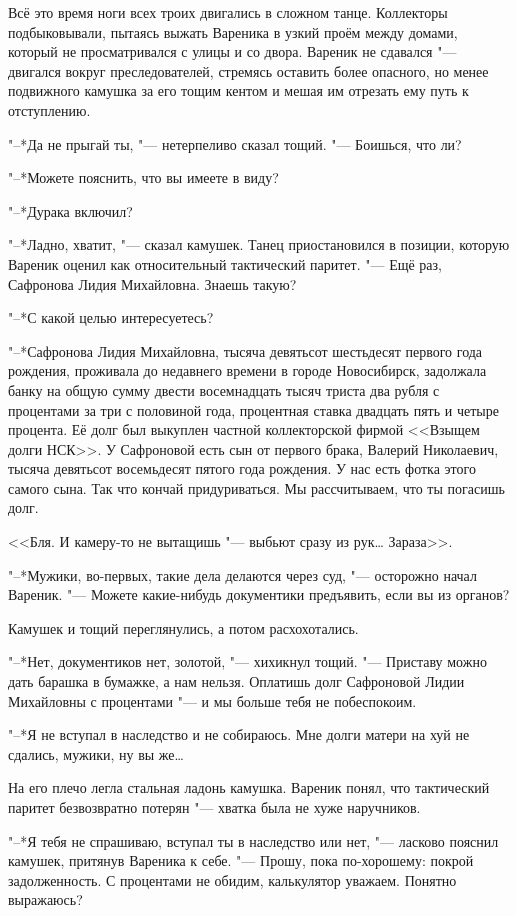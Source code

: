 Всё это время ноги всех троих двигались в сложном танце.
Коллекторы подбыковывали, пытаясь выжать Вареника в узкий проём между домами, который не просматривался с улицы и со двора.
Вареник не сдавался "--- двигался вокруг преследователей, стремясь оставить более опасного, но менее подвижного камушка за его тощим кентом и мешая им отрезать ему путь к отступлению.

"--*Да не прыгай ты, "--- нетерпеливо сказал тощий.
"--- Боишься, что ли?

"--*Можете пояснить, что вы имеете в виду?

"--*Дурака включил?

"--*Ладно, хватит, "--- сказал камушек.
Танец приостановился в позиции, которую Вареник оценил как относительный тактический паритет.
"--- Ещё раз, Сафронова Лидия Михайловна.
Знаешь такую?

"--*С какой целью интересуетесь?

"--*Сафронова Лидия Михайловна, тысяча девятьсот шестьдесят первого года рождения, проживала до недавнего времени в городе Новосибирск, задолжала банку на общую сумму двести восемнадцать тысяч триста два рубля с процентами за три с половиной года, процентная ставка двадцать пять и четыре процента.
Её долг был выкуплен частной коллекторской фирмой <<Взыщем долги НСК>>.
У Сафроновой есть сын от первого брака, Валерий Николаевич, тысяча девятьсот восемьдесят пятого года рождения.
У нас есть фотка этого самого сына.
Так что кончай придуриваться.
Мы рассчитываем, что ты погасишь долг.

<<Бля.
И камеру-то не вытащишь "--- выбьют сразу из рук\ldots{}
Зараза>>.

"--*Мужики, во-первых, такие дела делаются через суд, "--- осторожно начал Вареник.
"--- Можете какие-нибудь документики предъявить, если вы из органов?

Камушек и тощий переглянулись, а потом расхохотались.

"--*Нет, документиков нет, золотой, "--- хихикнул тощий.
"--- Приставу можно дать барашка в бумажке, а нам нельзя.
Оплатишь долг Сафроновой Лидии Михайловны с процентами "--- и мы больше тебя не побеспокоим.

"--*Я не вступал в наследство и не собираюсь.
Мне долги матери на хуй не сдались, мужики, ну вы же\ldots{}

На его плечо легла стальная ладонь камушка.
Вареник понял, что тактический паритет безвозвратно потерян "--- хватка была не хуже наручников.

"--*Я тебя не спрашиваю, вступал ты в наследство или нет, "--- ласково пояснил камушек, притянув Вареника к себе.
"--- Прошу, пока по-хорошему: покрой задолженность.
С процентами не обидим, калькулятор уважаем.
Понятно выражаюсь?

